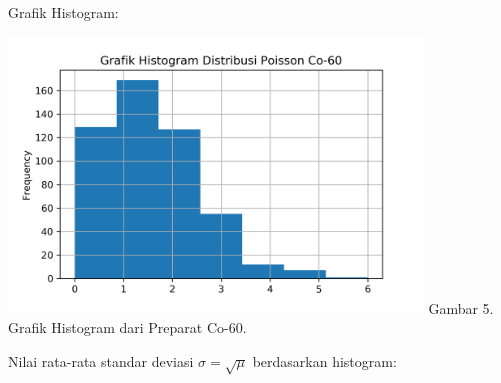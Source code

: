 \documentclass{article}
\begin{document}
			Grafik Histogram:
			\begin{center}
				\includegraphics[width=110mm]{Data/Co-60.png}
				Gambar 5. Grafik Histogram dari Preparat Co-60.
			\end{center} 
			Nilai rata-rata standar deviasi $\sigma = \sqrt{\mu}$ berdasarkan histogram:\\
			
\end{document}
